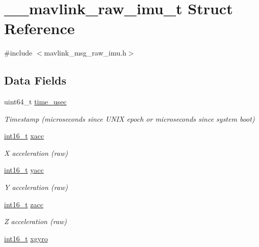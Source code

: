 \hypertarget{struct____mavlink__raw__imu__t}{\section{\-\_\-\-\_\-mavlink\-\_\-raw\-\_\-imu\-\_\-t Struct Reference}
\label{struct____mavlink__raw__imu__t}
}


{\ttfamily \#include $<$mavlink\-\_\-msg\-\_\-raw\-\_\-imu.\-h$>$}

\subsection*{Data Fields}
\begin{DoxyCompactItemize}
\item 
uint64\-\_\-t \hyperlink{struct____mavlink__raw__imu__t_a571520057ab2c9fa547fca7755099dfc}{time\-\_\-usec}
\begin{DoxyCompactList}\small\item\em Timestamp (microseconds since U\-N\-I\-X epoch or microseconds since system boot) \end{DoxyCompactList}\item 
\hyperlink{stdint_8h_aa343fa3b3d06292b959ffdd4c4703b06}{int16\-\_\-t} \hyperlink{struct____mavlink__raw__imu__t_ade9a866890ed99f81ce8bd7dbef2c920}{xacc}
\begin{DoxyCompactList}\small\item\em X acceleration (raw) \end{DoxyCompactList}\item 
\hyperlink{stdint_8h_aa343fa3b3d06292b959ffdd4c4703b06}{int16\-\_\-t} \hyperlink{struct____mavlink__raw__imu__t_a5080c838e03f9ed2237fffbfd26ff1a3}{yacc}
\begin{DoxyCompactList}\small\item\em Y acceleration (raw) \end{DoxyCompactList}\item 
\hyperlink{stdint_8h_aa343fa3b3d06292b959ffdd4c4703b06}{int16\-\_\-t} \hyperlink{struct____mavlink__raw__imu__t_a0c71dfe587d17f471e59ed5acd5691f8}{zacc}
\begin{DoxyCompactList}\small\item\em Z acceleration (raw) \end{DoxyCompactList}\item 
\hyperlink{stdint_8h_aa343fa3b3d06292b959ffdd4c4703b06}{int16\-\_\-t} \hyperlink{struct____mavlink__raw__imu__t_ad1b8a0589cf0a476cb04629dcb60bbe9}{xgyro}

\end{DoxyCompactItemize}
